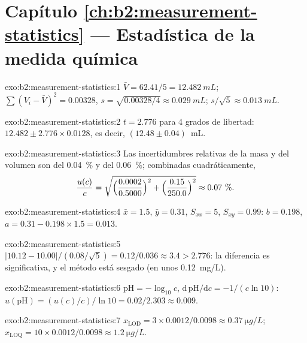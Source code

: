 \section*{Capítulo \ref{ch:b2:measurement-statistics} --- Estadística de la medida química}

\begin{solution}{exo:b2:measurement-statistics:1}
$\bar V = 62.41/5 = \qty{12.482}{mL}$; $\sum(V_i - \bar V)^2 = 0.00328$, $s = \sqrt{0.00328/4} \approx
\qty{0.029}{mL}$; $s/\sqrt5 \approx \qty{0.013}{mL}$.
\end{solution}

\begin{solution}{exo:b2:measurement-statistics:2}
$t = 2.776$ para 4 grados de libertad: $12.482 \pm 2.776 \times 0.0128$, es decir, $(12.48 \pm 0.04)$~mL.
\end{solution}

\begin{solution}{exo:b2:measurement-statistics:3}
Las incertidumbres relativas de la masa y del volumen son del 0.04~\% y del 0.06~\%; combinadas
cuadráticamente,
\[\frac{u(c)}{c} = \sqrt{\Bigl(\frac{0.0002}{0.5000}\Bigr)^2 + \Bigl(\frac{0.15}{250.0}\Bigr)^2}
\approx 0.07~\%.\]
\end{solution}

\begin{solution}{exo:b2:measurement-statistics:4}
$\bar x = 1.5$, $\bar y = 0.31$, $S_{xx} = 5$, $S_{xy} = 0.99$: $b = 0.198$, $a = 0.31 - 0.198 \times 1.5
= 0.013$.
\end{solution}

\begin{solution}{exo:b2:measurement-statistics:5}
$|10.12 - 10.00|/(0.08/\sqrt5) = 0.12/0.036 \approx 3.4 > 2.776$: la diferencia es significativa, y el
método está sesgado (en unos \qty{+0.12}{mg/L}).
\end{solution}

\begin{solution}{exo:b2:measurement-statistics:6}
$\mathrm{pH} = -\log_{10}c$, $\mathrm d\,\mathrm{pH}/\mathrm dc = -1/(c\ln10)$:
$u(\mathrm{pH}) = (u(c)/c)/\ln10 = 0.02/2.303 \approx 0.009$.
\end{solution}

\begin{solution}{exo:b2:measurement-statistics:7}
$x_{\mathrm{LOD}} = 3 \times 0.0012/0.0098 \approx \qty{0.37}{\micro g/L}$; $x_{\mathrm{LOQ}} = 10
\times 0.0012/0.0098 \approx \qty{1.2}{\micro g/L}$.
\end{solution}

